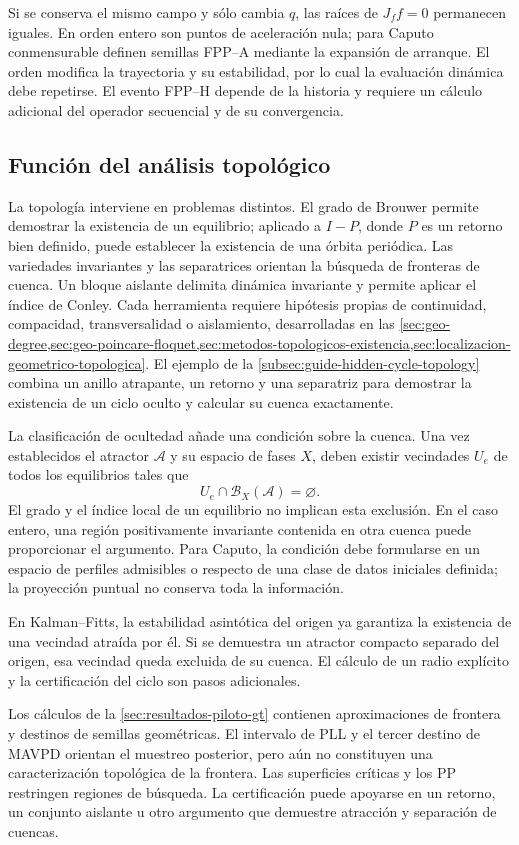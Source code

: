 Si se conserva el mismo campo y sólo cambia \(q\), las raíces de
\(J_ff=0\) permanecen iguales. En orden entero son puntos de aceleración
nula; para Caputo conmensurable definen semillas FPP--A mediante la expansión
de arranque. El orden modifica la trayectoria y su estabilidad, por lo cual
la evaluación dinámica debe repetirse. El evento FPP--H depende de la
historia y requiere un cálculo adicional del operador secuencial y de su
convergencia.

\subsection{Función del análisis topológico}

La topología interviene en problemas distintos. El grado de Brouwer permite
demostrar la existencia de un equilibrio; aplicado a \(I-P\), donde \(P\)
es un retorno bien definido, puede establecer la existencia de una órbita
periódica. Las variedades invariantes y las separatrices orientan la búsqueda
de fronteras de cuenca. Un bloque aislante delimita dinámica invariante y
permite aplicar el índice de Conley. Cada herramienta requiere hipótesis
propias de continuidad, compacidad, transversalidad o aislamiento, desarrolladas
en las \cref{sec:geo-degree,sec:geo-poincare-floquet,sec:metodos-topologicos-existencia,sec:localizacion-geometrico-topologica}.
El ejemplo de la \cref{subsec:guide-hidden-cycle-topology} combina un anillo
atrapante, un retorno y una separatriz para demostrar la existencia de un
ciclo oculto y calcular su cuenca exactamente.

La clasificación de ocultedad añade una condición sobre la cuenca. Una vez
establecidos el atractor \(\mathcal A\) y su espacio de fases \(X\), deben
existir vecindades \(U_e\) de todos los equilibrios tales que
\[
 U_e\cap\mathcal B_X(\mathcal A)=\varnothing.
\]
El grado y el índice local de un equilibrio no implican esta exclusión. En
el caso entero, una región positivamente invariante contenida en otra cuenca
puede proporcionar el argumento. Para Caputo, la condición debe formularse
en un espacio de perfiles admisibles o respecto de una clase de datos
iniciales definida; la proyección puntual no conserva toda la información.

En Kalman--Fitts, la estabilidad asintótica del origen ya garantiza la
existencia de una vecindad atraída por él. Si se demuestra un atractor
compacto separado del origen, esa vecindad queda excluida de su cuenca. El
cálculo de un radio explícito y la certificación del ciclo son pasos
adicionales.

Los cálculos de la \cref{sec:resultados-piloto-gt} contienen aproximaciones
de frontera y destinos de semillas geométricas. El intervalo de PLL y el
tercer destino de MAVPD orientan el muestreo posterior, pero aún no constituyen
una caracterización topológica de la frontera. Las superficies críticas y
los PP restringen regiones de búsqueda. La certificación puede apoyarse en
un retorno, un conjunto aislante u otro argumento que demuestre atracción
y separación de cuencas.
